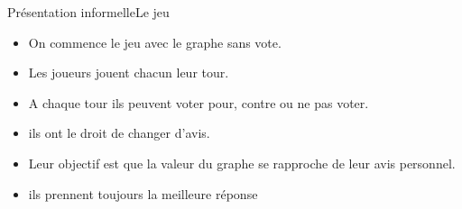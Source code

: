 \documentclass{beamer}
\begin{document}
\begin{frame}{Présentation informelle}{Le jeu}
\begin{minipage}[c]{.30\linewidth}
\begin{overprint}
      \end{overprint}
    \end{minipage}\hfill
    \begin{minipage}[c]{.70\linewidth}
      \begin{itemize}
        \item On commence le jeu avec le graphe sans vote.
        \item Les joueurs jouent chacun leur tour.
        \item A chaque tour ils peuvent voter pour, contre ou ne pas voter.
        \item ils ont le droit de changer d'avis.
        \item Leur objectif est que la valeur du graphe se rapproche de leur avis personnel.
        \item ils prennent toujours la meilleure réponse
      \end{itemize}
    \end{minipage}
  \end{frame}
\end{document}
